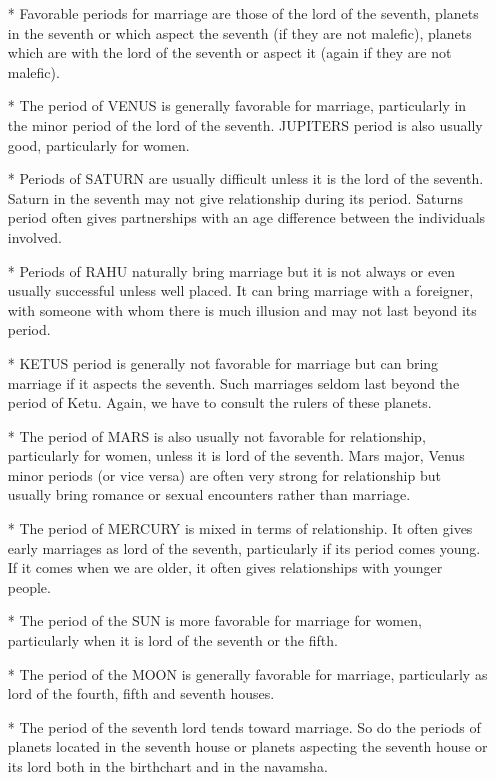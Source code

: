 \begin{enumerate}
\item[*] Favorable periods for marriage are those of the lord of the seventh, planets in the seventh or which aspect the seventh (if they are not malefic), planets which are with the lord of the seventh or aspect it (again if they are not malefic).
\item[*] The period of VENUS is generally favorable for marriage, particularly in the minor period of the lord of the seventh. JUPITERS period is also usually good, particularly for women.
\item[*] Periods of SATURN are usually difficult unless it is the lord of the seventh. Saturn in the seventh may not give relationship during its period. Saturns period often gives partnerships with an age difference between the individuals involved.
\item[*] Periods of RAHU naturally bring marriage but it is not always or even usually successful unless well placed. It can bring marriage with a foreigner, with someone with whom there is much illusion and may not last beyond its period.
\item[*] KETUS period is generally not favorable for marriage but can bring marriage if it aspects the seventh. Such marriages seldom last beyond the period of Ketu. Again, we have to consult the rulers of these planets.
\item[*] The period of MARS is also usually not favorable for relationship, particularly for women, unless it is lord of the seventh. Mars major, Venus minor periods (or vice versa) are often very strong for relationship but usually bring romance or sexual encounters rather than marriage.
\item[*] The period of MERCURY is mixed in terms of relationship. It often gives early marriages as lord of the seventh, particularly if its period comes young. If it comes when we are older, it often gives relationships with younger people.
\item[*] The period of the SUN is more favorable for marriage for women, particularly when it is lord of the seventh or the fifth.
\item[*] The period of the MOON is generally favorable for marriage, particularly as lord of the fourth, fifth and seventh houses.
\item[*] The period of the seventh lord tends toward marriage. So do the periods of planets located in the seventh house or planets aspecting the seventh house or its lord both in the birthchart and in the navamsha.
 \end{enumerate}

